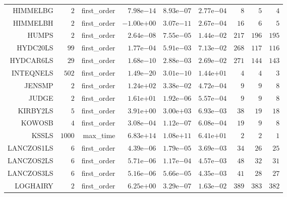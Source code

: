 \begin{longtable}{rrrrrrrrr}
HIMMELBG & \(     2\) & first\_order & \( 7.98\)e\(-14\) & \( 8.93\)e\(-07\) & \( 2.77\)e\(-04\) & \(     8\) & \(     5\) & \(     4\) \\
HIMMELBH & \(     2\) & first\_order & \(-1.00\)e\(+00\) & \( 3.07\)e\(-11\) & \( 2.67\)e\(-04\) & \(    16\) & \(     6\) & \(     5\) \\
HUMPS & \(     2\) & first\_order & \( 2.64\)e\(-08\) & \( 7.55\)e\(-05\) & \( 1.44\)e\(-02\) & \(   217\) & \(   196\) & \(   195\) \\
HYDC20LS & \(    99\) & first\_order & \( 1.77\)e\(-04\) & \( 5.91\)e\(-03\) & \( 7.13\)e\(-02\) & \(   268\) & \(   117\) & \(   116\) \\
HYDCAR6LS & \(    29\) & first\_order & \( 1.68\)e\(-10\) & \( 2.88\)e\(-03\) & \( 2.69\)e\(-02\) & \(   271\) & \(   144\) & \(   143\) \\
INTEQNELS & \(   502\) & first\_order & \( 1.49\)e\(-20\) & \( 3.01\)e\(-10\) & \( 1.44\)e\(+01\) & \(     4\) & \(     4\) & \(     3\) \\
JENSMP & \(     2\) & first\_order & \( 1.24\)e\(+02\) & \( 3.38\)e\(-02\) & \( 4.72\)e\(-04\) & \(     9\) & \(     9\) & \(     8\) \\
JUDGE & \(     2\) & first\_order & \( 1.61\)e\(+01\) & \( 1.92\)e\(-06\) & \( 5.57\)e\(-04\) & \(     9\) & \(     9\) & \(     8\) \\
KIRBY2LS & \(     5\) & first\_order & \( 3.91\)e\(+00\) & \( 3.00\)e\(+03\) & \( 6.93\)e\(-03\) & \(    38\) & \(    19\) & \(    18\) \\
KOWOSB & \(     4\) & first\_order & \( 3.08\)e\(-04\) & \( 1.12\)e\(-07\) & \( 6.08\)e\(-04\) & \(    19\) & \(     9\) & \(     8\) \\
KSSLS & \(  1000\) & max\_time & \( 6.83\)e\(+14\) & \( 1.08\)e\(+11\) & \( 6.41\)e\(+01\) & \(     2\) & \(     2\) & \(     1\) \\
LANCZOS1LS & \(     6\) & first\_order & \( 4.39\)e\(-06\) & \( 1.79\)e\(-05\) & \( 3.69\)e\(-03\) & \(    34\) & \(    26\) & \(    25\) \\
LANCZOS2LS & \(     6\) & first\_order & \( 5.71\)e\(-06\) & \( 1.17\)e\(-04\) & \( 4.57\)e\(-03\) & \(    48\) & \(    32\) & \(    31\) \\
LANCZOS3LS & \(     6\) & first\_order & \( 5.16\)e\(-06\) & \( 5.66\)e\(-05\) & \( 4.35\)e\(-03\) & \(    41\) & \(    28\) & \(    27\) \\
LOGHAIRY & \(     2\) & first\_order & \( 6.25\)e\(+00\) & \( 3.29\)e\(-07\) & \( 1.63\)e\(-02\) & \(   389\) & \(   383\) & \(   382\) \\

\end{longtable}
